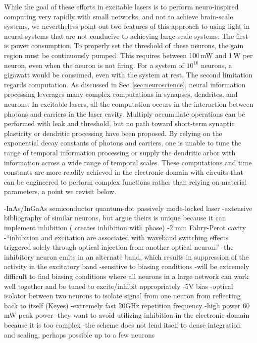 While the goal of these efforts in excitable lasers is to perform neuro-inspired computing very rapidly with small networks, and not to achieve brain-scale systems, we nevertheless point out two features of this approach to using light in neural systems that are not conducive to achieving large-scale systems. The first is power consumption. To properly set the threshold of these neurons, the gain region must be continuously pumped. This requires between 100\,mW and 1\,W per neuron, even when the neuron is not firing. For a system of $10^{10}$ neurons, a gigawatt would be consumed, even with the system at rest. The second limitation regards computation. As discussed in Sec.\,\ref{sec:neuroscience}, neural information processing leverages many complex computations in synapses, dendrites, and neurons. In excitable lasers, all the computation occurs in the interaction between photons and carriers in the laser cavity. Multiply-accumulate operations can be performed with leak and threshold, but no path toward short-term synaptic plasticity or dendritic processing have been proposed. By relying on the exponential decay constants of photons and carriers, one is unable to tune the range of temporal information processing or supply the dendritic arbor with information across a wide range of temporal scales. These computations and time constants are more readily achieved in the electronic domain with circuits that can be engineered to perform complex functions rather than relying on material parameters, a point we revisit below.

\cite{meka2016}
-InAs/InGaAs semiconductor quantum-dot passively mode-locked laser
-extensive bibliography of similar neurons, but argue theirs is unique because it can implement inhibition (\cite{alva2013} creates inhibition with phase)
-2 mm Fabry-Perot cavity
-``inhibition and excitation are associated with waveband switching effects triggered solely through optical injection from another optical neuron.''
-the inhibitory neuron emits in an alternate band, which results in suppression of the activity in the excitatory band
-sensitive to biasing conditions
-will be extremely difficult to find biasing conditions where all neurons in a large network can work well together and be tuned to excite/inhibit appropriately
-5V bias
-optical isolator between two neurons to isolate signal from one neuron from reflecting back to itself (Keyes)
-extremely fast 20GHz repetition frequency
-high power 60 mW peak power
-they want to avoid utilizing inhibition in the electronic domain because it is too complex
-the scheme does not lend itself to dense integration and scaling, perhaps possible up to a few neurons

